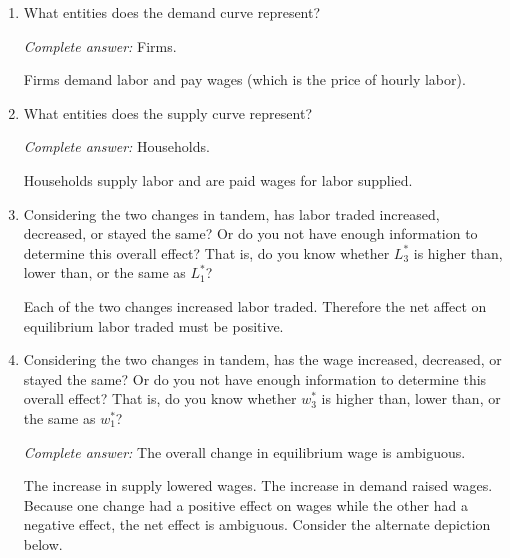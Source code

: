 \documentclass[
    letterpaper,paper=portrait,fleqn,
    DIV=16,fontsize=12pt,twoside=semi,
    parskip=full-,
    headings=standardclasses]
{scrartcl}
\begin{document}
\begin{enumerate}
\item What entities does the demand curve represent?

\begin{solution}
\emph{Complete answer:} Firms.

Firms demand labor and pay wages (which is the price of hourly labor).
\end{solution}

\item What entities does the supply curve represent?

\begin{solution}
\emph{Complete answer:} Households.

Households supply labor and are paid wages for labor supplied.
\end{solution}

\item Considering the two changes in tandem, has labor traded increased, decreased, or stayed the same? Or do you not have enough information to determine this overall effect? That is, do you know whether $L^*_3$ is higher than, lower than, or the same as $L^*_1$?

\begin{solution}
Each of the two changes increased labor traded. Therefore the net affect on equilibrium labor traded must be positive.
\end{solution}

\item Considering the two changes in tandem, has the wage increased, decreased, or stayed the same? Or do you not have enough information to determine this overall effect? That is, do you know whether $w^*_3$ is higher than, lower than, or the same as $w^*_1$?

\begin{solution}
\emph{Complete answer:} The overall change in equilibrium wage is ambiguous.

The increase in supply lowered wages. The increase in demand raised wages. Because one change had a positive effect on wages while the other had a negative effect, the net effect is ambiguous. Consider the alternate depiction below.

\begin{center}
\end{center}
\vspace{-12pt}
\end{solution}

\end{enumerate}
\end{document}
